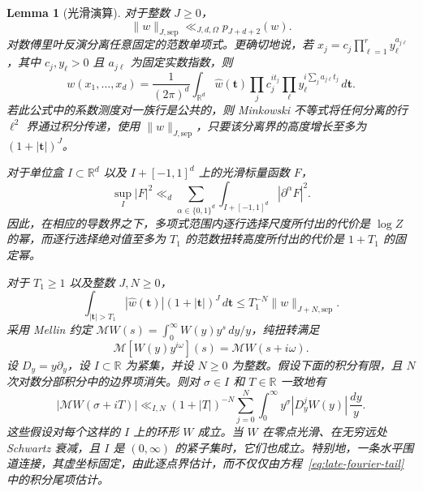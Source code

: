 \documentclass[11pt,a4paper]{article}
\numberwithin{equation}{section}
\numberwithin{figure}{section}
\newtheorem{lemma}[theorem]{Lemma}
\theoremstyle{definition}
\theoremstyle{remark}
\begin{document}
\begin{lemma}[光滑演算]\label{lem:smooth-calculus}
对于整数 $J\ge0$，
\[
 \|w\|_{J,\mathrm{sep}}\ll_{J,d,\Omega}p_{J+d+2}(w).
\]
对数傅里叶反演分离任意固定的范数单项式。更确切地说，若 $x_j=c_j\prod_{\ell=1}^r y_\ell^{a_{j\ell}}$，其中 $c_j,y_\ell>0$ 且 $a_{j\ell}$ 为固定实数指数，则
\[
 w(x_1,\ldots,x_d)=\frac1{(2\pi)^d}\int_{\mathbb R^d}
 \widehat w(\boldsymbol t)\prod_j c_j^{it_j}
       \prod_\ell y_\ell^{i\sum_j a_{j\ell}t_j}\,d\boldsymbol t.
\]
若此公式中的系数测度对一族行是公共的，则 Minkowski 不等式将任何分离的行 $\ell^2$ 界通过积分传递，使用 $\|w\|_{J,\mathrm{sep}}$，只要该分离界的高度增长至多为 $(1+|\boldsymbol t|)^J$。

对于单位盒 $I\subset\mathbb R^d$ 以及 $I+[-1,1]^d$ 上的光滑标量函数 $F$，
\begin{equation}\label{eq:parameter-sobolev}
 \sup_I|F|^2\ll_d
 \sum_{\alpha\in\{0,1\}^d}
 \int_{I+[-1,1]^d}|\partial^\alpha F|^2.
\end{equation}
因此，在相应的导数界之下，多项式范围内逐行选择尺度所付出的代价是 $\log Z$ 的幂，而逐行选择绝对值至多为 $T_1$ 的范数扭转高度所付出的代价是 $1+T_1$ 的固定幂。

对于 $T_1\ge1$ 以及整数 $J,N\ge0$，
\begin{equation}\label{eq:late-fourier-tail}
 \int_{|\boldsymbol t|>T_1}|\widehat w(\boldsymbol t)|
             (1+|\boldsymbol t|)^J\,d\boldsymbol t
 \le T_1^{-N}\|w\|_{J+N,\mathrm{sep}}.
\end{equation}
采用 Mellin 约定
$\mathcal MW(s)=\int_0^\infty W(y)y^s\,dy/y$，纯扭转满足
\[
 \mathcal M[W(y)y^{i\omega}](s)=\mathcal MW(s+i\omega).
\]
设 $D_y=y\partial_y$，设 $I\subset\mathbb R$ 为紧集，并设 $N\ge0$ 为整数。假设下面的积分有限，且 $N$ 次对数分部积分中的边界项消失。则对 $\sigma\in I$ 和 $T\in\mathbb R$ 一致地有
\begin{equation}\label{eq:pointwise-mellin-tail}
 |\mathcal MW(\sigma+iT)|
 \ll_{I,N}(1+|T|)^{-N}
     \sum_{j=0}^N\int_0^\infty y^\sigma|D_y^jW(y)|\,\frac{dy}{y}.
\end{equation}
这些假设对每个这样的 $I$ 上的环形 $W$ 成立。当 $W$ 在零点光滑、在无穷远处 Schwartz 衰减，且 $I$ 是 $(0,\infty)$ 的紧子集时，它们也成立。特别地，一条水平围道连接，其虚坐标固定，由此逐点界估计，而不仅仅由方程~\eqref{eq:late-fourier-tail} 中的积分尾项估计。


\end{lemma}
\end{document}
